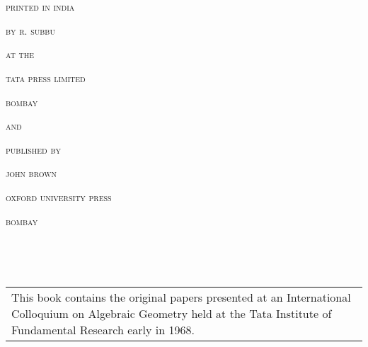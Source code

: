 ~\phantom{a}
\thispagestyle{empty}

\vfill\eject

~\phantom{a}
\thispagestyle{empty}

\vfill

\begin{center}
\textsc{printed in india}

\textsc{by r. subbu}

\textsc{at the}

\textsc{tata press limited}

\textsc{bombay}

\textsc{and}

\textsc{published by}

\textsc{john brown}

\textsc{oxford university press}

\textsc{bombay}
\end{center}

\vfill\eject

~\phantom{a}
\thispagestyle{empty}

\vfill\eject

~\phantom{a}
\thispagestyle{empty}

\vskip 1cm

\begin{center}
\begin{tabular}{p{7.5cm}}
This book contains the original papers presented at an International Colloquium on Algebraic Geometry held at the Tata Institute of Fundamental Research early in 1968.
\end{tabular}
\end{center}
